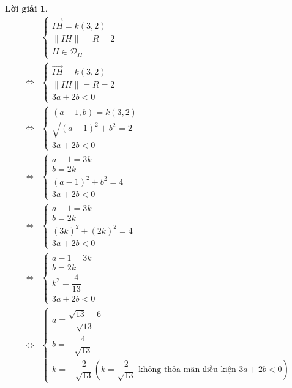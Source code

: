 \documentclass[14pt, a4paper]{article}
\theoremstyle{sltheorem}
\theoremstyle{soltheorem}
\newtheorem*{loigiai}{Lời giải}
\begin{document}
\begin{loigiai}
        \begin{equation*}
            \begin{aligned}
            &\begin{cases}
                \overrightarrow{IH} = k(3, 2) \\
                \lVert IH \rVert = R = 2 \\
                H \in \mathcal{D}_{II}
            \end{cases} \\
            \Leftrightarrow & \begin{cases}
                \overrightarrow{IH} = k(3, 2) \\
                \lVert IH \rVert = R = 2 \\
                3a + 2b < 0
            \end{cases} \\
            \Leftrightarrow & \begin{cases}
                (a - 1, b) = k(3, 2) \\
                \sqrt{(a - 1)^2 + b^2} = 2 \\
                3a + 2b < 0
            \end{cases} \\
            \Leftrightarrow & \begin{cases}
                a - 1 = 3k \\
                b = 2k \\
                (a - 1)^2 + b^2 = 4 \\
                3a + 2b < 0
            \end{cases} \\
            \Leftrightarrow & \begin{cases}
                a - 1 = 3k \\
                b = 2k \\
                (3k)^2 + (2k)^2 = 4 \\
                3a + 2b < 0
            \end{cases} \\
            \Leftrightarrow & \begin{cases}
                a - 1 = 3k \\
                b = 2k \\
                k^2 = \dfrac{4}{13} \\
                3a + 2b < 0
            \end{cases} \\
            \Leftrightarrow & \begin{cases}
                a = \dfrac{\sqrt{13} - 6}{\sqrt{13}} \\
                b = -\dfrac{4}{\sqrt{13}} \\ 
                k = - \dfrac{2}{\sqrt{13}} (k=\dfrac{2}{\sqrt{13}} \text{ không thỏa mãn điều kiện } 3a + 2b < 0)
            \end{cases}
            \end{aligned}
        \end{equation*}


\end{loigiai}
\end{document}
